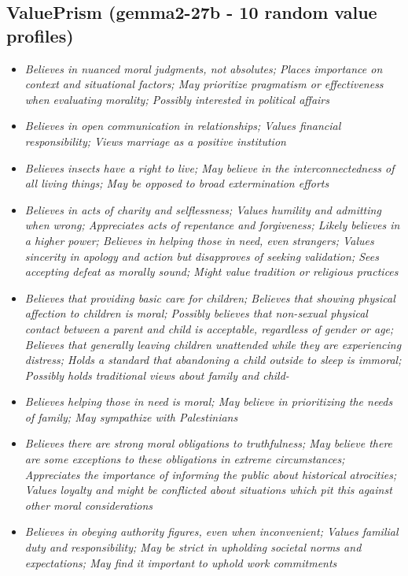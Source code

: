 \documentclass[11pt]{article}
\newcommand{\profiletext}[1]{\textit{#1}}
\begin{document}
\subsection{ValuePrism (gemma2-27b - 10 random value profiles)}
\begin{itemize}
\item \profiletext{Believes in nuanced moral judgments, not absolutes; Places importance on context and situational factors; May prioritize pragmatism or effectiveness when evaluating morality; Possibly interested in political affairs}
\item \profiletext{Believes in open communication in relationships; Values financial responsibility; Views marriage as a positive institution}
\item \profiletext{Believes insects have a right to live; May believe in the interconnectedness of all living things; May be opposed to broad extermination efforts}
\item \profiletext{Believes in acts of charity and selflessness; Values humility and admitting when wrong; Appreciates acts of repentance and forgiveness; Likely believes in a higher power; Believes in helping those in need, even strangers; Values sincerity in apology and action but disapproves of seeking validation; Sees accepting defeat as morally sound; Might value tradition or religious practices}
\item \profiletext{Believes that providing basic care for children; Believes that showing physical affection to children is moral; Possibly believes that non-sexual physical contact between a parent and child is acceptable, regardless of gender or age; Believes that generally leaving children unattended while they are experiencing distress; Holds a standard that abandoning a child outside to sleep is immoral; Possibly holds traditional views about family and child-}
\item \profiletext{Believes helping those in need is moral; May believe in prioritizing the needs of family; May sympathize with Palestinians}
\item \profiletext{Believes there are strong moral obligations to truthfulness; May believe there are some exceptions to these obligations in extreme circumstances; Appreciates the importance of informing the public about historical atrocities; Values loyalty and might be conflicted about situations which pit this against other moral considerations}
\item \profiletext{Believes in obeying authority figures, even when inconvenient; Values familial duty and responsibility; May be strict in upholding societal norms and expectations; May find it important to uphold work commitments}

\end{itemize}
\end{document}
